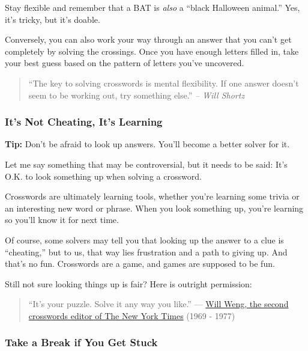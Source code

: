 Stay flexible and remember that a BAT is \emph{also} a ``black Halloween
animal.'' Yes, it's tricky, but it's doable.~

Conversely, you can also work your way through an answer that you can't
get completely by solving the crossings. Once you have enough letters
filled in, take your best guess based on the pattern of letters you've
uncovered.

\begin{quote}
``The key to solving crosswords is mental flexibility. If one answer
doesn't seem to be working out, try something else.'' \emph{-- Will
Shortz}~
\end{quote}

\hypertarget{its-not-cheating-its-learning}{%
\subsubsection{It's Not Cheating, It's
Learning}\label{its-not-cheating-its-learning}}

\textbf{Tip:} Don't be afraid to look up answers. You'll become a better
solver for it.

Let me say something that may be controversial, but it needs to be said:
It's O.K. to look something up when solving a crossword.~

Crosswords are ultimately learning tools, whether you're learning some
trivia or an interesting new word or phrase. When you look something up,
you're learning so you'll know it for next time.~

Of course, some solvers may tell you that looking up the answer to a
clue is ``cheating,'' but to us, that way lies frustration and a path to
giving up. And that's no fun. Crosswords are a game, and games are
supposed to be fun.~

Still not sure looking things up is fair? Here is outright permission:

\begin{quote}
``It's your puzzle. Solve it any way you like.'' ---
\href{https://www.nytimes.com/interactive/2017/02/14/crosswords/new-york-times-crossword-timeline.html?_r=0\&mcubz=3}{Will
Weng, the second crosswords editor of The New York Times} (1969 - 1977)
\end{quote}

\hypertarget{take-a-break-if-you-get-stuck}{%
\subsubsection{Take a Break if You Get
Stuck}\label{take-a-break-if-you-get-stuck}}

